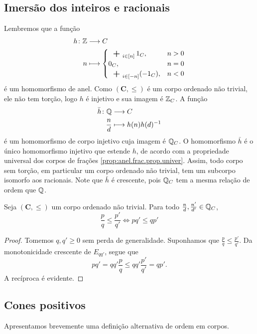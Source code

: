 \subsection{Imersão dos inteiros e racionais}

Lembremos que a função
	\begin{align*}
	\func{h}{\Z}{C}{n}{
		\begin{cases}
			\sum_{i \in [n]} 1_C,& n>0 \\
			0_C,& n=0 \\
			\sum_{i \in [-n]} (-1_C),& n<0
		\end{cases}
	}
	\end{align*}
é um homomorfismo de anel. Como $(\bm C,\leq)$ é um corpo ordenado não trivial, ele não tem torção, logo $h$ é injetivo e sua imagem é $\mathbb{Z}_C$. A função
	\begin{align*}
	{\bar h}\colon {\mathbb{Q}} &\longrightarrow {C} \\{\frac{n}{d}} &\longmapsto h(n)h(d)^{-1}
	\end{align*}
é um homomorfismo de corpo injetivo cuja imagem é $\mathbb{Q}_C$. O homomorfismo $\bar h$ é o único homomorfismo injetivo que estende $h$, de acordo com a propriedade universal dos corpos de frações \ref{prop:anel.frac.prop.univer}. Assim, todo corpo sem torção, em particular um corpo ordenado não trivial, tem um subcorpo isomorfo aos racionais. 	Note que $\bar h$ é crescente, pois $\mathbb{Q}_C$ tem a mesma relação de ordem que $\mathbb{Q}$.

\begin{proposition}
Seja $(\bm C,\leq)$ um corpo ordenado não trivial. Para todo $\frac{n}{d},\frac{n'}{d'} \in \mathbb{Q}_C$,
	\begin{equation*}
	\frac{p}{q} \leq \frac{p'}{q'} \Leftrightarrow pq' \leq qp'
	\end{equation*}
\end{proposition}
\begin{proof}
Tomemos $q,q' \geq 0$ sem perda de generalidade. Suponhamos que $\frac{p}{q} \leq \frac{p'}{q'}$. Da monotonicidade crescente de $E_{qq'}$, segue que
	\begin{equation*}
	pq' = qq'\frac{p}{q} \leq qq'\frac{p'}{q'} = qp'.
	\end{equation*}
A recíproca é evidente.
\end{proof}


\subsection{Cones positivos}

Apresentamos brevemente uma definição alternativa de ordem em corpos.

